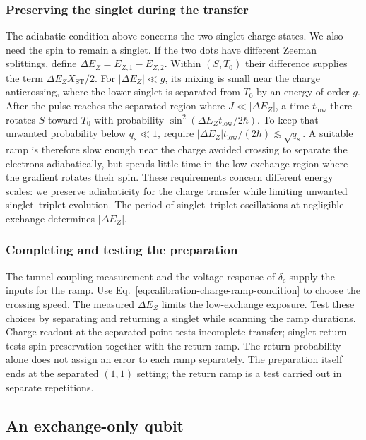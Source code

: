\subsubsection{Preserving the singlet during the transfer}
The adiabatic condition above concerns the two singlet charge states.
We also need the spin to remain a singlet.
If the two dots have different Zeeman splittings, define
$\Delta E_Z=E_{Z,1}-E_{Z,2}$. Within $(S,T_0)$ their difference
supplies the term $\Delta E_Z X_{\mathrm{ST}}/2$.
For $|\Delta E_Z|\ll g$, its mixing is small near the charge
anticrossing, where the lower singlet is separated from $T_0$
by an energy of order $g$.
After the pulse reaches the separated region where
$J\ll|\Delta E_Z|$, a time $t_{\mathrm{low}}$ there rotates
$S$ toward $T_0$ with probability
$\sin^2(\Delta E_Zt_{\mathrm{low}}/2\hbar)$.
To keep that unwanted probability below $q_s\ll1$, require
$|\Delta E_Z|t_{\mathrm{low}}/(2\hbar)\lesssim\sqrt{q_s}$.
A suitable ramp is therefore slow enough near the charge avoided
crossing to separate the electrons adiabatically, but spends little
time in the low-exchange region where the gradient rotates their spin.
These requirements concern different energy scales: we preserve
adiabaticity for the charge transfer while limiting unwanted
singlet--triplet evolution.
The period of singlet--triplet oscillations at negligible exchange
determines $|\Delta E_Z|$.

\subsubsection{Completing and testing the preparation}
The tunnel-coupling measurement and the voltage response of
$\delta_c$ supply the inputs for the ramp. Use Eq.~\eqref{eq:calibration-charge-ramp-condition}
to choose the crossing speed. The measured $\Delta E_Z$ limits
the low-exchange exposure. Test these choices by separating and
returning a singlet while scanning the ramp durations. Charge
readout at the separated point tests incomplete transfer; singlet
return tests spin preservation together with the return ramp.
The return probability alone does not assign an error to each ramp
separately. The preparation itself ends at the separated $(1,1)$
setting; the return ramp is a test carried out in separate repetitions.

\subsection{An exchange-only qubit}
\label{sec:calibration-eo-initialization}

